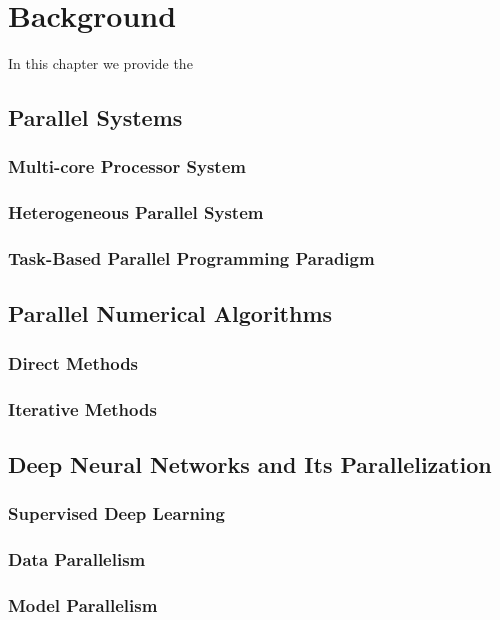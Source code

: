 \chapter{Background}
\label{chap:background}

In this chapter we provide the 

\section{Parallel Systems}
\subsection{Multi-core Processor System}
\subsection{Heterogeneous Parallel System}
\subsection{Task-Based Parallel Programming Paradigm}

\section{Parallel Numerical Algorithms}
\subsection{Direct Methods}
\subsection{Iterative Methods}

\section{Deep Neural Networks and Its Parallelization}
\subsection{Supervised Deep Learning}
\subsection{Data Parallelism}
\subsection{Model Parallelism}
